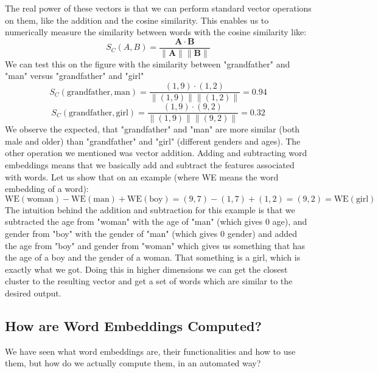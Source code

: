\documentclass[12pt]{article}
\numberwithin{equation}{section}
\begin{document}
\begin{spacing}{1.5}
	The real power of these vectors is that we can perform standard vector operations on them, like the addition and the cosine similarity. This enables us to numerically measure the similarity between words with the cosine similarity like:
	\begin{equation}\label{cosine_similarity}
		S_C(A, B) = \frac{\mathbf{A}\cdot \mathbf{B}}{\|\mathbf{A}\| \| \mathbf{B}\|}
	\end{equation}
	We can test this on the figure with the similarity between "grandfather" and "man" versus "grandfather" and "girl"
	$$ S_C(\text{grandfather}, \text{man}) = \frac{(1, 9) \cdot (1, 2)}{\|(1, 9)\| \|(1, 2)\|} = 0.94 $$ 
	$$ S_C(\text{grandfather}, \text{girl}) = \frac{(1, 9) \cdot (9, 2)}{\|(1, 9)\| \|(9, 2)\|} = 0.32 $$ 
	We observe the expected, that "grandfather" and "man" are more similar (both male and older) than "grandfather" and "girl" (different genders and ages). The other operation we mentioned was vector addition. Adding and subtracting word embeddings means that we basically add and subtract the features associated with words. Let us show that on an example (where WE means the word embedding of a word):
	$$ \text{WE}(\text{woman}) - \text{WE}(\text{man}) + \text{WE}(\text{boy}) = (9, 7) - (1,7) + (1, 2) = (9, 2) = \text{WE}(\text{girl})$$
	The intuition behind the addition and subtraction for this example is that we subtracted the age from "woman" with the age of "man" (which gives $0$ age), and gender from "boy" with the gender of "man" (which gives $0$ gender) and added the age from "boy" and gender from "woman" which gives us something that has the age of a boy and the gender of a woman. That something is a girl, which is exactly what we got. Doing this in higher dimensions we can get the closest cluster to the resulting vector and get a set of words which are similar to the desired output.
	
	\subsection{How are Word Embeddings Computed?}
	We have seen what word embeddings are, their functionalities and how to use them, but how do we actually compute them, in an automated way? \\
	

\end{spacing}
\end{document}
